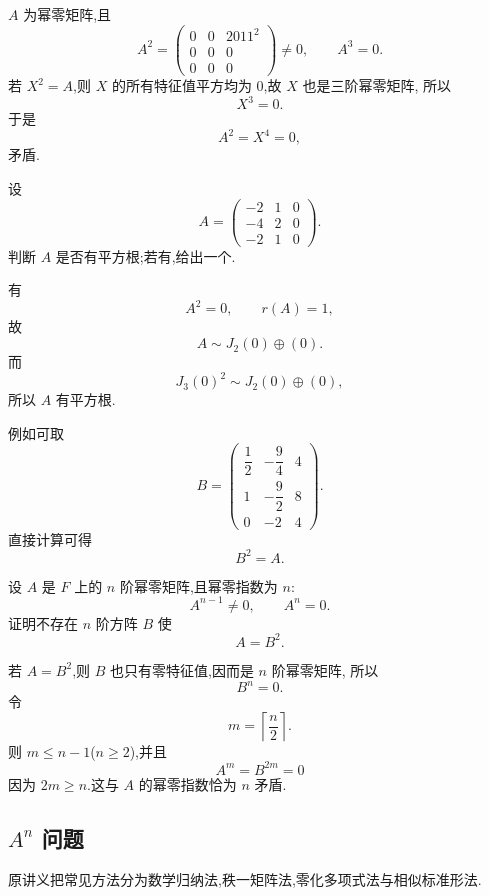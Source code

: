 \begin{solution}
$A$ 为幂零矩阵,且
\[
A^2=
\begin{pmatrix}
0&0&2011^2\\
0&0&0\\
0&0&0
\end{pmatrix}
\neq0,
\qquad
A^3=0.
\]
若 $X^2=A$,则 $X$ 的所有特征值平方均为 $0$,故 $X$ 也是三阶幂零矩阵,
所以
\[
X^3=0.
\]
于是
\[
A^2=X^4=0,
\]
矛盾.
\end{solution}


\begin{example}
设
\[
A=
\begin{pmatrix}
-2&1&0\\
-4&2&0\\
-2&1&0
\end{pmatrix}.
\]
判断 $A$ 是否有平方根;若有,给出一个.
\end{example}
\exampleblank

\begin{solution}
有
\[
A^2=0,\qquad r(A)=1,
\]
故
\[
A\sim J_2(0)\oplus(0).
\]
而
\[
J_3(0)^2\sim J_2(0)\oplus(0),
\]
所以 $A$ 有平方根.

例如可取
\[
\boxed{
B=
\begin{pmatrix}
\dfrac12&-\dfrac94&4\\[2mm]
1&-\dfrac92&8\\
0&-2&4
\end{pmatrix}.
}
\]
直接计算可得
\[
B^2=A.
\]
\end{solution}


\begin{example}
设 $A$ 是 $F$ 上的 $n$ 阶幂零矩阵,且幂零指数为 $n$:
\[
A^{n-1}\neq0,\qquad A^n=0.
\]
证明不存在 $n$ 阶方阵 $B$ 使
\[
A=B^2.
\]
\end{example}
\exampleblank

\begin{solution}
若 $A=B^2$,则 $B$ 也只有零特征值,因而是 $n$ 阶幂零矩阵,
所以
\[
B^n=0.
\]
令
\[
m=\left\lceil\dfrac n2\right\rceil.
\]
则 $m\leq n-1$($n\geq2$),并且
\[
A^m=B^{2m}=0
\]
因为 $2m\geq n$.这与 $A$ 的幂零指数恰为 $n$ 矛盾.
\end{solution}


\subsection{\texorpdfstring{$A^n$}{A 的 n 次方} 问题}

原讲义把常见方法分为数学归纳法,秩一矩阵法,零化多项式法与相似标准形法.

